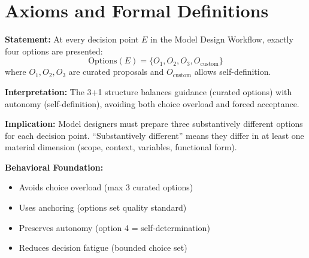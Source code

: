 \section{Axioms and Formal Definitions}
\label{sec:eee-axioms}

\begin{tcolorbox}[colback=gray!5!white, colframe=gray!75!black,
    title=Axiom MD-1: 3+1 Choice Architecture]
\textbf{Statement:} At every decision point $E$ in the Model Design Workflow,
exactly four options are presented:
\begin{equation}
\text{Options}(E) = \{O_1, O_2, O_3, O_{\text{custom}}\}
\end{equation}
where $O_1, O_2, O_3$ are curated proposals and $O_{\text{custom}}$ allows
self-definition.

\textbf{Interpretation:} The 3+1 structure balances guidance (curated options)
with autonomy (self-definition), avoiding both choice overload and forced acceptance.

\textbf{Implication:} Model designers must prepare three substantively different
options for each decision point. ``Substantively different'' means they differ
in at least one material dimension (scope, context, variables, functional form).

\textbf{Behavioral Foundation:}
\begin{itemize}[nosep]
\item Avoids choice overload (max 3 curated options)
\item Uses anchoring (options set quality standard)
\item Preserves autonomy (option 4 = self-determination)
\item Reduces decision fatigue (bounded choice set)
\end{itemize}
\end{tcolorbox}

